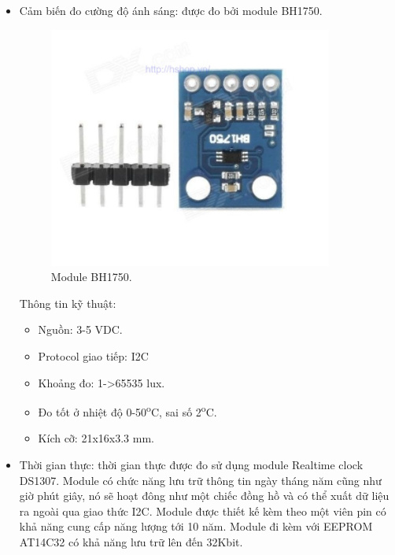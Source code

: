\documentclass[a4paper,12pt,oneside]{article}
\begin{document}
\begin{itemize}
\item Cảm biến đo cường độ ánh sáng: được đo bởi module BH1750.
\begin{figure}[H]
	\centering
	\includegraphics[scale=.8]{hinh/BH175.png}
	\caption{Module BH1750\cite{bh1750}.}
	\label{fig:BH175}
\end{figure}

\noindent Thông tin kỹ thuật\cite{bh1750}:
\begin{itemize}
\item Nguồn: 3-5 VDC.
\item Protocol giao tiếp: I2C
\item Khoảng đo: 1->65535 lux.
\item Đo tốt ở nhiệt độ 0-50\textsuperscript{o}C, sai số 2\textsuperscript{o}C.
\item Kích cỡ: 21x16x3.3 mm.
\end{itemize}

\item Thời gian thực: thời gian thực được đo sử dụng module Realtime clock DS1307. Module có chức năng lưu trữ thông tin ngày tháng năm cũng như giờ phút giây, nó sẽ hoạt đông như một chiếc đồng hồ và có thể xuất dữ liệu ra ngoài qua giao thức I2C. Module được thiết kế kèm theo một viên pin có khả năng cung cấp năng lượng tới 10 năm. Module đi kèm với EEPROM AT14C32 có khả năng lưu trữ lên đến 32Kbit.\\


\end{itemize}
\end{document}
